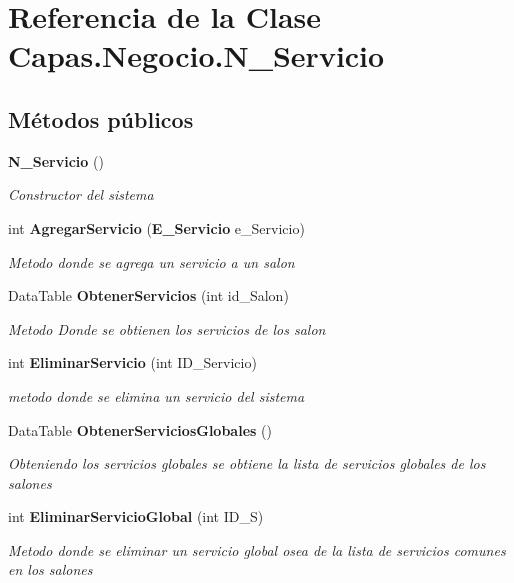 \section{Referencia de la Clase Capas.\+Negocio.\+N\+\_\+\+Servicio}
\label{class_capas_1_1_negocio_1_1_n___servicio}
\subsection*{Métodos públicos}
\begin{DoxyCompactItemize}
\item 
{\bf N\+\_\+\+Servicio} ()
\begin{DoxyCompactList}\small\item\em Constructor del sistema \end{DoxyCompactList}\item 
int {\bf Agregar\+Servicio} ({\bf E\+\_\+\+Servicio} e\+\_\+\+Servicio)
\begin{DoxyCompactList}\small\item\em Metodo donde se agrega un servicio a un salon \end{DoxyCompactList}\item 
Data\+Table {\bf Obtener\+Servicios} (int id\+\_\+\+Salon)
\begin{DoxyCompactList}\small\item\em Metodo Donde se obtienen los servicios de los salon \end{DoxyCompactList}\item 
int {\bf Eliminar\+Servicio} (int I\+D\+\_\+\+Servicio)
\begin{DoxyCompactList}\small\item\em metodo donde se elimina un servicio del sistema \end{DoxyCompactList}\item 
Data\+Table {\bf Obtener\+Servicios\+Globales} ()
\begin{DoxyCompactList}\small\item\em Obteniendo los servicios globales se obtiene la lista de servicios globales de los salones \end{DoxyCompactList}\item 
int {\bf Eliminar\+Servicio\+Global} (int I\+D\+\_\+S)
\begin{DoxyCompactList}\small\item\em Metodo donde se eliminar un servicio global osea de la lista de servicios comunes en los salones \end{DoxyCompactList}\item 

\end{DoxyCompactItemize}
